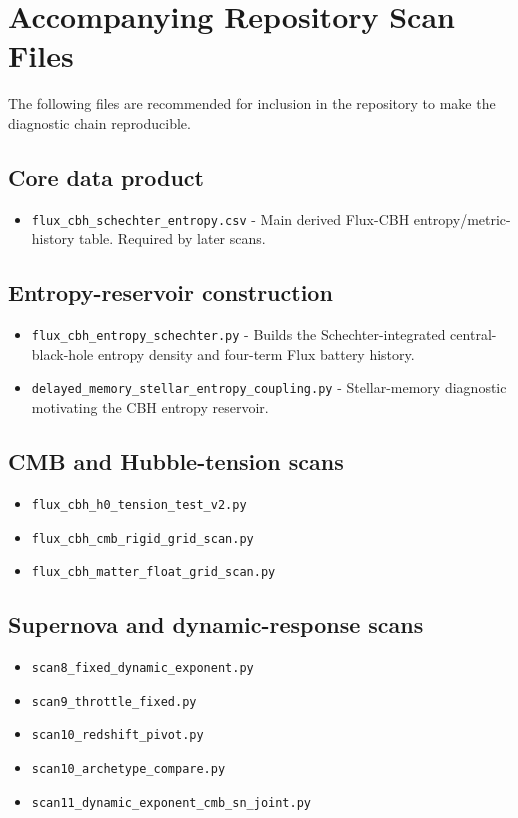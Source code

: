 \documentclass[11pt,a4paper]{article}
\begin{document}
\appendix
\section{Accompanying Repository Scan Files}

The following files are recommended for inclusion in the repository to make the diagnostic chain reproducible.

\subsection{Core data product}
\begin{itemize}
\item \texttt{flux\_cbh\_schechter\_entropy.csv} - Main derived Flux-CBH entropy/metric-history table. Required by later scans.
\end{itemize}

\subsection{Entropy-reservoir construction}
\begin{itemize}
\item \texttt{flux\_cbh\_entropy\_schechter.py} - Builds the Schechter-integrated central-black-hole entropy density and four-term Flux battery history.
\item \texttt{delayed\_memory\_stellar\_entropy\_coupling.py} - Stellar-memory diagnostic motivating the CBH entropy reservoir.
\end{itemize}

\subsection{CMB and Hubble-tension scans}
\begin{itemize}
\item \texttt{flux\_cbh\_h0\_tension\_test\_v2.py}
\item \texttt{flux\_cbh\_cmb\_rigid\_grid\_scan.py}
\item \texttt{flux\_cbh\_matter\_float\_grid\_scan.py}
\end{itemize}

\subsection{Supernova and dynamic-response scans}
\begin{itemize}
\item \texttt{scan8\_fixed\_dynamic\_exponent.py}
\item \texttt{scan9\_throttle\_fixed.py}
\item \texttt{scan10\_redshift\_pivot.py}
\item \texttt{scan10\_archetype\_compare.py}
\item \texttt{scan11\_dynamic\_exponent\_cmb\_sn\_joint.py}
\end{itemize}
\end{document}
